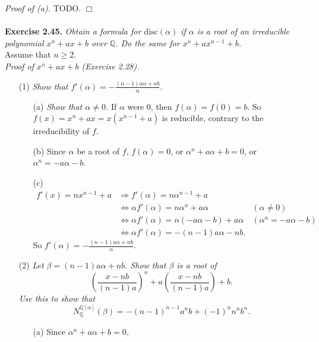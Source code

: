 \documentclass{article}
\begin{document}
\emph{Proof of (a).}
TODO.
$\Box$ \\\\






\textbf{Exercise 2.45.}
\emph{Obtain a formula for $\text{disc}(\alpha)$ if $\alpha$ is a root of
an irreducible polynomial $x^n + ax + b$ over $\mathbb{Q}$.
Do the same for $x^n + ax^{n-1}+b$.} \\

Assume that $n \geq 2$. \\

\emph{Proof of $x^n + ax + b$ (Exercise 2.28).}
\begin{enumerate}
\item[(1)]
\emph{Show that $f'(\alpha) = -\frac{(n-1)a\alpha+nb}{\alpha}$.}
  \begin{enumerate}
  \item[(a)]
  \emph{Show that $\alpha \neq 0$.}
  If $\alpha$ were $0$, then $f(\alpha) = f(0) = b$.
  So $f(x) = x^n+ax = x(x^{n-1}+a)$ is reducible, contrary to the irreducibility of $f$.
  \item[(b)]
  Since $\alpha$ be a root of $f$,
  $f(\alpha) = 0$,
  or $\alpha^n + a\alpha + b = 0$,
  or $\alpha^n = -a\alpha-b$.
  \item[(c)]
  \begin{align*}
  f'(x) = nx^{n-1} + a
  &\Longrightarrow
  f'(\alpha) = n\alpha^{n-1} + a \\
  &\Longleftrightarrow
  \alpha f'(\alpha) = n\alpha^n + a\alpha
    &(\alpha \neq 0) \\
  &\Longleftrightarrow
  \alpha f'(\alpha) = n(-a\alpha-b) + a\alpha
    &(\alpha^n = -a\alpha-b) \\
  &\Longleftrightarrow
  \alpha f'(\alpha) = -(n-1)a\alpha-nb.
  \end{align*}
  So $f'(\alpha) = -\frac{(n-1)a\alpha+nb}{\alpha}$.
  \end{enumerate}
\item[(2)]
\emph{
Let $\beta = (n-1)a\alpha+nb$.
Show that $\beta$ is a root of
$$\left( \frac{x-nb}{(n-1)a} \right)^n + a\left( \frac{x-nb}{(n-1)a} \right) + b.$$
Use this to show that
$$N_{\mathbb{Q}}^{\mathbb{Q}[\alpha]}(\beta) = -(n-1)^{n-1}a^nb+(-1)^n n^n b^n.$$}
  \begin{enumerate}
  \item[(a)]
  Since $\alpha^n + a\alpha + b = 0$,

\end{enumerate}
\end{enumerate}
\end{document}
